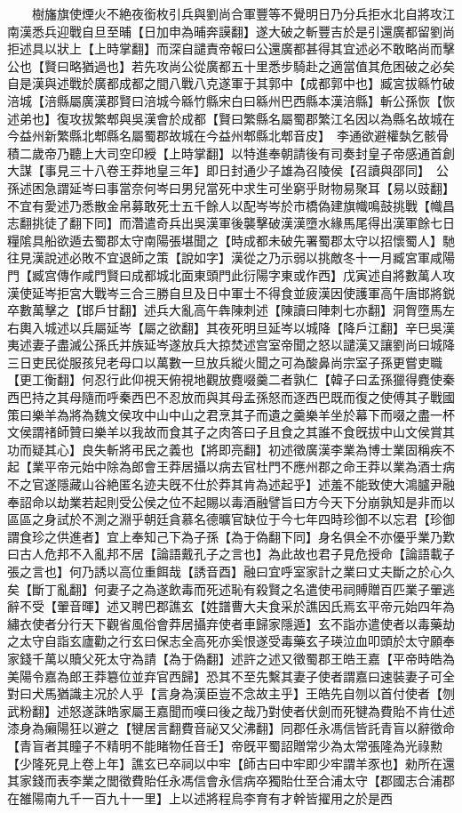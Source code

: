 　　樹旛旗使煙火不絶夜銜枚引兵與劉尚合軍豐等不覺明日乃分兵拒水北自將攻江南漢悉兵迎戰自旦至晡【日加申為晡奔謨翻】遂大破之斬豐吉於是引還廣都留劉尚拒述具以狀上【上時掌翻】而深自譴責帝報曰公還廣都甚得其宜述必不敢略尚而擊公也【賢曰略猶過也】若先攻尚公從廣都五十里悉步騎赴之適當值其危困破之必矣自是漢與述戰於廣都成都之間八戰八克遂軍于其郭中【成都郭中也】臧宮拔緜竹破涪城【涪縣屬廣漢郡賢曰涪城今緜竹縣宋白曰緜州巴西縣本漢涪縣】斬公孫恢【恢述弟也】復攻拔繁郫與吳漢會於成都【賢曰繁縣名屬蜀郡繁江名因以為縣名故城在今益州新繁縣北郫縣名屬蜀郡故城在今益州郫縣北郫音皮】　李通欲避權埶乞骸骨積二歲帝乃聽上大司空印綬【上時掌翻】以特進奉朝請後有司奏封皇子帝感通首創大謀【事見三十八卷王莽地皇三年】即日封通少子雄為召陵侯【召讀與邵同】　公孫述困急謂延岑曰事當奈何岑曰男兒當死中求生可坐窮乎財物易聚耳【易以豉翻】不宜有愛述乃悉散金帛募敢死士五千餘人以配岑岑於市橋偽建旗幟鳴鼓挑戰【幟昌志翻挑徒了翻下同】而濳遣奇兵出吳漢軍後襲擊破漢漢墮水緣馬尾得出漢軍餘七日糧隂具船欲遁去蜀郡太守南陽張堪聞之【時成都未破先署蜀郡太守以招懷蜀人】馳往見漢說述必敗不宜退師之策【說如字】漢從之乃示弱以挑敵冬十一月臧宮軍咸陽門【臧宫傳作咸門賢曰成都城北面東頭門此衍陽字東或作西】戊寅述自將數萬人攻漢使延岑拒宮大戰岑三合三勝自旦及日中軍士不得食並疲漢因使護軍高午唐邯將鋭卒數萬擊之【邯戶甘翻】述兵大亂高午犇陳刺述【陳讀曰陣刺七亦翻】洞胷墮馬左右輿入城述以兵屬延岑【屬之欲翻】其夜死明旦延岑以城降【降戶江翻】辛巳吳漢夷述妻子盡滅公孫氏并族延岑遂放兵大掠焚述宫室帝聞之怒以譴漢又讓劉尚曰城降三日吏民從服孩兒老母口以萬數一旦放兵縱火聞之可為酸鼻尚宗室子孫更嘗吏職【更工衡翻】何忍行此仰視天俯視地觀放麑啜羹二者孰仁【韓子曰孟孫獵得麑使秦西巴持之其母隨而呼秦西巴不忍放而與其母孟孫怒而逐西巴既而復之使傅其子戰國策曰樂羊為將為魏文侯攻中山中山之君烹其子而遺之羹樂羊坐於幕下而啜之盡一杯文侯謂禇師贊曰樂羊以我故而食其子之肉答曰子且食之其誰不食旣拔中山文侯賞其功而疑其心】良失斬將弔民之義也【將即亮翻】初述徵廣漢李業為博士業固稱疾不起【業平帝元始中除為郎會王莽居攝以病去官杜門不應州郡之命王莽以業為酒士病不之官遂隱藏山谷絶匿名迹夫旣不仕於莽其肯為述起乎】述羞不能致使大鴻臚尹融奉詔命以劫業若起則受公侯之位不起賜以毒酒融譬旨曰方今天下分崩孰知是非而以區區之身試於不測之淵乎朝廷貪慕名德曠官缺位于今七年四時珍御不以忘君【珍御謂食珍之供進者】宜上奉知己下為子孫【為于偽翻下同】身名俱全不亦優乎業乃歎曰古人危邦不入亂邦不居【論語戴孔子之言也】為此故也君子見危授命【論語載子張之言也】何乃誘以高位重餌哉【誘音酉】融曰宜呼室家計之業曰丈夫斷之於心久矣【斷丁亂翻】何妻子之為遂飲毒而死述恥有殺賢之名遣使弔祠賻贈百匹業子翬逃辭不受【翬音暉】述又聘巴郡譙玄【姓譜曹大夫食采於譙因氏焉玄平帝元始四年為繡衣使者分行天下觀省風俗會莽居攝弃使者車歸家隱遁】玄不詣亦遣使者以毒藥劫之太守自詣玄廬勸之行玄曰保志全高死亦奚恨遂受毒藥玄子瑛泣血叩頭於太守願奉家錢千萬以贖父死太守為請【為于偽翻】述許之述又徵蜀郡王皓王嘉【平帝時皓為美陽令嘉為郎王莽簒位並弃官西歸】恐其不至先繫其妻子使者謂嘉曰速裝妻子可全對曰犬馬猶識主况於人乎【言身為漢臣豈不念故主乎】王皓先自刎以首付使者【刎武粉翻】述怒遂誅皓家屬王嘉聞而嘆曰後之哉乃對使者伏劍而死犍為費貽不肯仕述漆身為癩陽狂以避之【犍居言翻費音祕又父沸翻】同郡任永馮信皆託青盲以辭徵命【青盲者其瞳子不精明不能睹物任音壬】帝旣平蜀詔贈常少為太常張隆為光祿勲【少隆死見上卷上年】譙玄已卒祠以中牢【師古曰中牢即少牢謂羊豕也】勑所在還其家錢而表李業之閭徵費貽任永馮信會永信病卒獨貽仕至合浦太守【郡國志合浦郡在雒陽南九千一百九十一里】上以述將程烏李育有才幹皆擢用之於是西